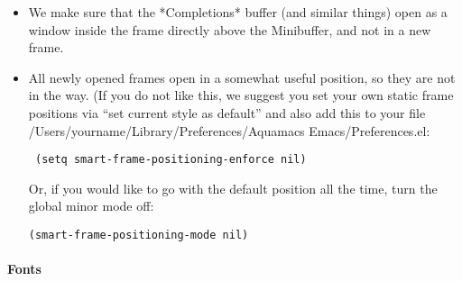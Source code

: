 \begin{itemize}
	
\item We make sure that the *Completions* buffer (and similar things)
    open as a window inside the frame directly above the Minibuffer,
    and not in a new frame.

\item All newly opened frames open in a somewhat useful position, so
they are not in the way. (If you do not like this, we suggest you set
    your own static frame positions via ``set current style as default''
    and also add this to your file /Users/yourname/Library/Preferences/Aquamacs
    Emacs/Preferences.el:

	\texttt{ (setq smart-frame-positioning-enforce nil)}

Or, if you would like to go with the default position all the time,
    turn the global minor mode off:

   \texttt{(smart-frame-positioning-mode nil)}
\end{itemize}
	

\paragraph{Fonts}
	
